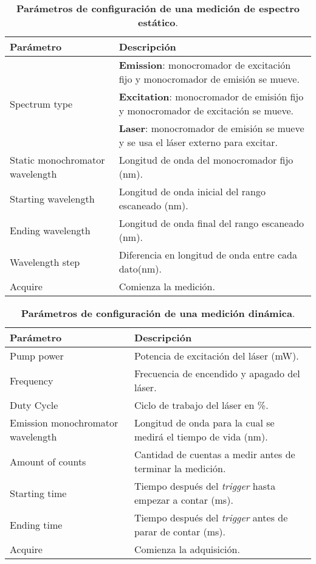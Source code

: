 \begin{table}
    \centering
    \begin{tabularx}{\textwidth}{|l|X|}
        \hline
        \textbf{Parámetro} & \textbf{Descripción} \\
        \hline
        \multirow{3}{3cm}{Spectrum type} & \textbf{Emission}: monocromador de excitación fijo y monocromador de emisión se mueve. \\
        \cline{2-2}
        & \textbf{Excitation}: monocromador de emisión fijo y monocromador de excitación se mueve. \\
        \cline{2-2}
        & \textbf{Laser}: monocromador de emisión se mueve y se usa el láser externo para excitar. \\
        \hline
        Static monochromator wavelength & Longitud de onda del monocromador fijo (nm). \\
        \hline
        Starting wavelength & Longitud de onda inicial del rango escaneado (nm). \\
        \hline
        Ending wavelength & Longitud de onda final del rango escaneado (nm). \\
        \hline
        Wavelength step & Diferencia en longitud de onda entre cada dato(nm). \\
        \hline
        Acquire & Comienza la medición. \\
        \hline
    \end{tabularx}
    \caption{\textbf{Parámetros de configuración de una medición de espectro estático}.}
    \label{tab:spectrum_measurement}
\end{table}

\begin{table}[htbp]
    \centering
    \begin{tabularx}{\textwidth}{|l|X|}
        \hline
        \textbf{Parámetro} & \textbf{Descripción} \\
        \hline
        Pump power & Potencia de excitación del láser (mW). \\
        \hline
        Frequency & Frecuencia de encendido y apagado del láser. \\
        \hline
        Duty Cycle & Ciclo de trabajo del láser en \%. \\
        \hline
        Emission monochromator wavelength & Longitud de onda para la cual se medirá el tiempo de vida (nm). \\
        \hline 
        Amount of counts & Cantidad de cuentas a medir antes de terminar la medición. \\
        \hline
        Starting time & Tiempo después del \textit{trigger} hasta empezar a contar (ms). \\
        \hline
        Ending time & Tiempo después del \textit{trigger} antes de parar de contar (ms). \\
        \hline
        Acquire & Comienza la adquisición.\\
        \hline
    \end{tabularx}
    \caption{\textbf{Parámetros de configuración de una medición dinámica}.}
    \label{tab:lifetime_measurement}
\end{table}

